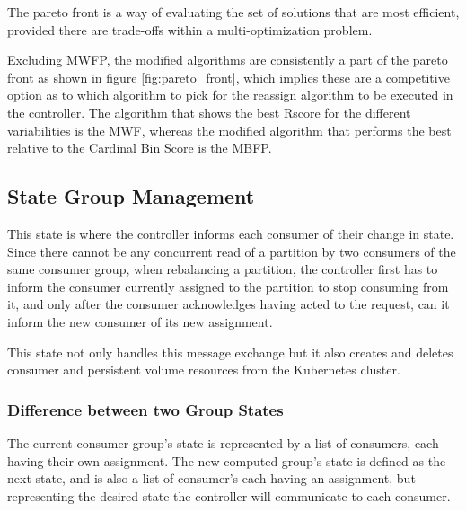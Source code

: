 The pareto front is a way of evaluating the set of solutions that are most
efficient, provided there are trade-offs within a multi-optimization problem.

Excluding MWFP, the modified algorithms are consistently a part of the pareto
front as shown in figure \ref{fig:pareto_front}, which implies these are a
competitive option as to which algorithm to pick for the reassign algorithm to
be executed in the controller. The algorithm that shows the best Rscore for the
different variabilities is the MWF, whereas the modified algorithm that performs
the best relative to the Cardinal Bin Score is the MBFP.

\subsection{State Group Management}
\label{sub:state_group_management}

This state is where the controller informs each consumer of their change in
state. Since there cannot be any concurrent read of a partition by two consumers
of the same consumer group, when rebalancing a partition, the controller first
has to inform the consumer currently assigned to the partition to stop consuming
from it, and only after the consumer acknowledges having acted to the request,
can it inform the new consumer of its new assignment.

This state not only handles this message exchange but it also creates and
deletes consumer and persistent volume resources from the Kubernetes cluster. 

\subsubsection{Difference between two Group States}

The current consumer group's state is represented by a list of consumers, each
having their own assignment. The new computed group's state is defined as the
next state, and is also a list of consumer's each having an assignment, but
representing the desired state the controller will communicate to each consumer.

